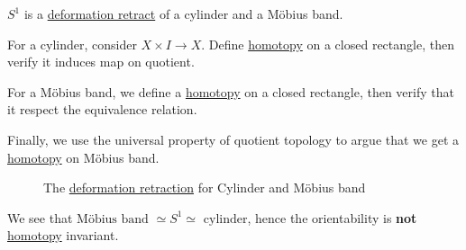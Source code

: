 \begin{eg}
	\(S^1\) is a \hyperref[def:deformation-retraction]{deformation retract} of a cylinder and a Möbius band.
\end{eg}
\begin{explanation}
	For a cylinder, consider \(X\times I \to X\). Define \hyperref[def:homotopy]{homotopy} on a closed rectangle, then verify it induces map on quotient.

	For a Möbius band, we define a \hyperref[def:homotopy]{homotopy} on a closed rectangle, then verify
	that it respect the equivalence relation.

	Finally, we use the universal property of quotient topology to argue that we get a
	\hyperref[def:homotopy]{homotopy} on Möbius band.

	\begin{figure}[H]
		\centering
		\caption{The \hyperref[def:deformation-retraction]{deformation retraction} for Cylinder and Möbius band}
		\label{fig:eg:cylinder-mobiusband}
	\end{figure}

	\begin{remark}
		We see that \(\text{Möbius band } \simeq S^1 \simeq \text{ cylinder} \), hence the orientability
		is \textbf{not} \hyperref[def:homotopy]{homotopy} invariant.
	\end{remark}
\end{explanation}